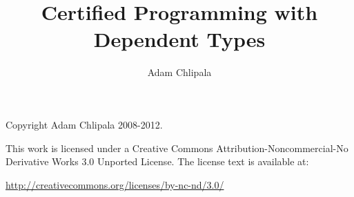 \documentclass[12pt]{report}
\title{Certified Programming with Dependent Types}
\author{Adam Chlipala}
\begin{document}
\maketitle

\thispagestyle{empty}
\mbox{}\vfill
\begin{center}

Copyright Adam Chlipala 2008-2012.


This work is licensed under a
Creative Commons Attribution-Noncommercial-No Derivative Works 3.0
Unported License.
The license text is available at:

\end{center}

\begin{center} \url{http://creativecommons.org/licenses/by-nc-nd/3.0/} \end{center}

\tableofcontents


















\clearpage
{}



\clearpage
{}
\printindex
\end{document}
